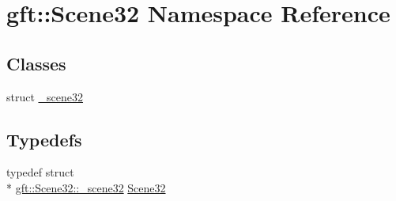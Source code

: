 \hypertarget{namespacegft_1_1Scene32}{\section{gft\-:\-:Scene32 Namespace Reference}
\label{namespacegft_1_1Scene32}
}
\subsection*{Classes}
\begin{DoxyCompactItemize}
\item 
struct \hyperlink{structgft_1_1Scene32_1_1__scene32}{\-\_\-scene32}
\end{DoxyCompactItemize}
\subsection*{Typedefs}
\begin{DoxyCompactItemize}
\item 
typedef struct \\*
\hyperlink{structgft_1_1Scene32_1_1__scene32}{gft\-::\-Scene32\-::\-\_\-scene32} \hyperlink{namespacegft_1_1Scene32_ae492ac529c9149889605a7bebd647c46}{Scene32}
\end{DoxyCompactItemize}
